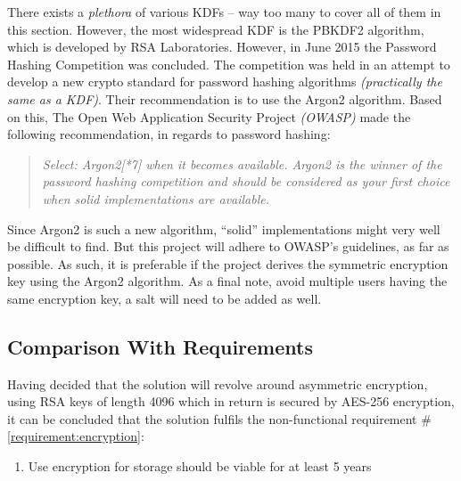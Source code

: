 				There exists a \emph{plethora} of various KDFs -- way too many to cover all of them in this section. However, the most widespread KDF is the PBKDF2 algorithm\cite{rfc2898}, which is developed by RSA Laboratories. However, in June 2015 the Password Hashing Competition was concluded\cite{phc}. The competition was held in an attempt to develop a new crypto standard for password hashing algorithms \emph{(practically the same as a KDF)}. Their recommendation is to use the Argon2 algorithm\cite{biryukov2015argon}. Based on this, The Open Web Application Security Project \emph{(OWASP)} made the following recommendation, in regards to password hashing:
				\begin{quote}
					\emph{Select:
						Argon2[*7] when it becomes available. Argon2 is the winner of the password hashing competition and should be considered as your first choice when solid implementations are available.
					}\\\cite{owasp_kdf}
				\end{quote}

				Since Argon2 is such a new algorithm, ``solid'' implementations might very well be difficult to find. But this project will adhere to OWASP's guidelines, as far as possible. As such, it is preferable if the project derives the symmetric encryption key using the Argon2 algorithm. As a final note, avoid multiple users having the same encryption key, a salt will need to be added as well. 

		\subsection{Comparison With Requirements}
			\label{requirement:fulfilled:sharing}
			\label{requirement:fulfilled:passwords_local}
			\label{requirement:fulfilled:encryption}
			Having decided that the solution will revolve around asymmetric encryption, using RSA keys of length 4096 which in return is secured by AES-256 encryption, it can be concluded that the solution fulfils the non-functional requirement \#\ref{requirement:encryption}:

			\vspace{-3ex}\begin{enumerate}
				\setlength\itemsep{0.1em}
				\setcounter{enumi}{4-1}
				\item Use encryption for storage should be viable for at least 5 years
			\end{enumerate}

